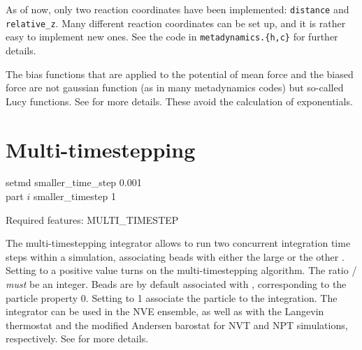 As of now, only two reaction coordinates have been implemented:
\texttt{distance} and \texttt{relative_z}. Many different reaction
coordinates can be set up, and it is rather easy to implement new
ones. See the code in \texttt{metadynamics.\{h,c\}} for further
details. 

The bias functions that are applied to the potential of mean force and
the biased force are not gaussian function (as in many metadynamics
codes) but so-called Lucy functions. See \cite{marsili09} for more
details. These avoid the calculation of exponentials.

\section{Multi-timestepping}

\begin{essyntax}
  setmd smaller\_time\_step 0.001 \\
  part $i$ smaller\_timestep 1

  Required features: MULTI\_TIMESTEP
\end{essyntax}

The multi-timestepping integrator allows to run two concurrent integration time
steps within a simulation, associating beads with either the large
 or the other .  Setting
 to a positive value turns on the multi-timestepping
algorithm.  The ratio / \emph{must} be
an integer.  Beads are by default associated with ,
corresponding to the particle property  0.  Setting
 to 1 associate the particle to the
 integration.  The integrator can be used in the NVE
ensemble, as well as with the Langevin thermostat and the modified Andersen
barostat for NVT and NPT simulations, respectively.  See \cite{bereau15} for
more details.

